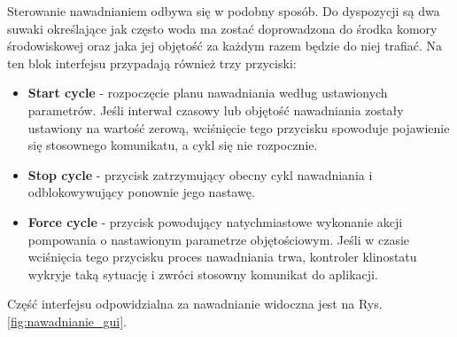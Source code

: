 Sterowanie nawadnianiem odbywa się w podobny sposób. Do dyspozycji są dwa suwaki określające jak często woda ma zostać doprowadzona do środka komory środowiskowej oraz jaka jej objętość za każdym razem będzie do niej trafiać. Na ten blok interfejsu przypadają również trzy przyciski:
\begin{itemize}
	\item \textbf{Start cycle} - rozpoczęcie planu nawadniania według ustawionych parametrów. Jeśli interwał czasowy lub objętość nawadniania zostały ustawiony na wartość zerową, wciśnięcie tego przycisku spowoduje pojawienie się stosownego komunikatu, a cykl się nie rozpocznie.
	\item \textbf{Stop cycle} - przycisk zatrzymujący obecny cykl nawadniania i odblokowywujący ponownie jego nastawę.
	\item \textbf{Force cycle} - przycisk powodujący natychmiastowe wykonanie akcji pompowania o nastawionym parametrze objętościowym. Jeśli w czasie wciśnięcia tego przycisku proces nawadniania trwa, kontroler klinostatu wykryje taką sytuację i zwróci stosowny komunikat do aplikacji.
\end{itemize}
Część interfejsu odpowidzialna za nawadnianie widoczna jest na Rys. \ref{fig:nawadnianie_gui}.\\

